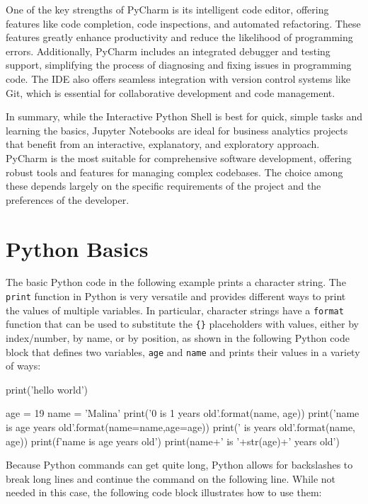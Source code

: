 One of the key strengths of PyCharm is its intelligent code editor, offering features like code completion, code inspections, and automated refactoring. These features greatly enhance productivity and reduce the likelihood of programming errors. Additionally, PyCharm includes an integrated debugger and testing support, simplifying the process of diagnosing and fixing issues in programming code. The IDE also offers seamless integration with version control systems like Git, which is essential for collaborative development and code management.

In summary, while the Interactive Python Shell is best for quick, simple tasks and learning the basics, Jupyter Notebooks are ideal for business analytics projects that benefit from an interactive, explanatory, and exploratory approach. PyCharm is the most suitable for comprehensive software development, offering robust tools and features for managing complex codebases. The choice among these depends largely on the specific requirements of the project and the preferences of the developer.


\section{Python Basics}

The basic Python code in the following example prints a character string. The \texttt{print} function in Python is very versatile and provides different ways to print the values of multiple variables. In particular, character strings have a \texttt{format} function that can be used to substitute the \texttt{\{\}} placeholders with values, either by index/number, by name, or by position, as shown in the following Python code block that defines two variables, \texttt{age} and \texttt{name} and prints their values in a variety of ways:

\begin{samepage}
\begin{pythoncode}
print('hello world')

age = 19
name = 'Malina'
print('{0} is {1} years old'.format(name, age))
print('{name} is {age} years old'.format(name=name,age=age))
print('{} is {} years old'.format(name, age))
print(f'{name} is {age} years old')
print(name+' is '+str(age)+' years old')
\end{pythoncode}
\end{samepage}

\noindent Because Python commands can get quite long, Python allows for backslashes to break long lines and continue the command on the following line. While not needed in this case, the following code block illustrates how to use them:

